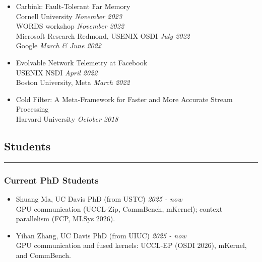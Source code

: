 \documentclass[letterpaper, 11pt]{article}
\newcommand\toRight{\hspace*{0pt}\hfill}
\begin{document}
\begin{itemize}
\item Carbink: Fault-Tolerant Far Memory\\
    Cornell University  \toRight \textit{November 2023}\\
    WORDS workshop \toRight \textit{November 2022}\\
    Microsoft Research Redmond, USENIX OSDI \toRight \textit{July 2022}\\
    Google \toRight \textit{ March \& June 2022}
    
\item Evolvable Network Telemetry at Facebook\\
    USENIX NSDI \toRight \textit{April 2022}\\
    Boston University, Meta \toRight \textit{March 2022}

\item Cold Filter: A Meta-Framework for Faster and More Accurate Stream Processing\\
    Harvard University \toRight \textit{October 2018}
    
\end{itemize}

\subsection*{\sc Students}
\hrule\vspace{0.2cm}

\subsubsection*{Current PhD Students}
\vspace{-0.1cm}

\begin{itemize}
    \setlength{\itemsep}{0pt}%
    \setlength{\parskip}{5pt}%

\item Shuang Ma, UC Davis PhD (from USTC) \toRight \textit{2025 - now} \\
        GPU communication (UCCL-Zip, CommBench, mKernel); context parallelism (FCP, MLSys 2026).

\item Yihan Zhang, UC Davis PhD (from UIUC) \toRight \textit{2025 - now} \\
        GPU communication and fused kernels: UCCL-EP (OSDI 2026), mKernel, and CommBench.
\end{itemize}

\vspace{-0.5cm}
\end{document}
